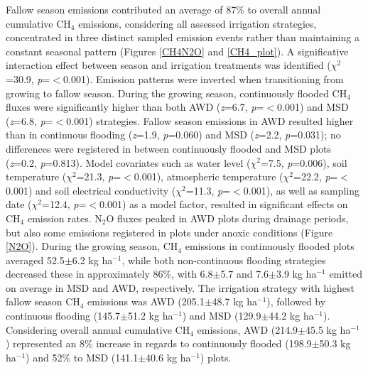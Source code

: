 Fallow season emissions contributed an average of 87\% to overall annual cumulative CH$_{4}$ emissions, considering all assessed irrigation strategies, concentrated in three distinct sampled emission events rather than maintaining a constant seasonal pattern (Figures \ref{CH4N2O} and \ref{CH4_plot}). A significative interaction effect between season and irrigation treatments was identified ($\chi^2$=30.9, \textit{p}=$<$0.001). Emission patterns were inverted when transitioning from growing to fallow season. During the growing season, continuously flooded CH$_{4}$ fluxes were significantly higher than both AWD (\textit{z}=6.7, \textit{p}=$<$0.001) and MSD (\textit{z}=6.8, \textit{p}=$<$0.001) strategies. Fallow season emissions in AWD resulted higher than in continuous flooding (\textit{z}=1.9, \textit{p}=0.060) and MSD (\textit{z}=2.2, \textit{p}=0.031); no differences were registered in between continuously flooded and MSD plots (\textit{z}=0.2, \textit{p}=0.813). Model covariates such as water level ($\chi^2$=7.5, \textit{p}=0.006), soil temperature ($\chi^2$=21.3, \textit{p}=$<$0.001), atmospheric temperature ($\chi^2$=22.2, \textit{p}=$<$0.001) and soil electrical conductivity ($\chi^2$=11.3, \textit{p}=$<$0.001), as well as sampling date ($\chi^2$=12.4, \textit{p}=$<$0.001) as a model factor, resulted in significant effects on CH$_{4}$ emission rates. N$_{2}$O fluxes peaked in AWD plots during drainage periods, but also some emissions registered in plots under anoxic conditions (Figure \ref{N2O}). During the growing season, CH$_{4}$ emissions in continuously flooded plots averaged 52.5$\pm$6.2 kg ha$^{-1}$, while both non-continuous flooding strategies decreased these in approximately 86\%, with 6.8$\pm$5.7 and 7.6$\pm$3.9 kg ha$^{-1}$ emitted on average in MSD and AWD, respectively. The irrigation strategy with highest fallow season CH$_{4}$ emissions was AWD (205.1$\pm$48.7 kg ha$^{-1}$), followed by continuous flooding (145.7$\pm$51.2 kg ha$^{-1}$) and MSD (129.9$\pm$44.2 kg ha$^{-1}$). Considering overall annual cumulative CH$_{4}$ emissions, AWD (214.9$\pm$45.5 kg ha$^{-1}$) represented an 8\% increase in regards to continuously flooded (198.9$\pm$50.3 kg ha$^{-1}$) and 52\% to MSD (141.1$\pm$40.6 kg ha$^{-1}$) plots. 
\\ 

